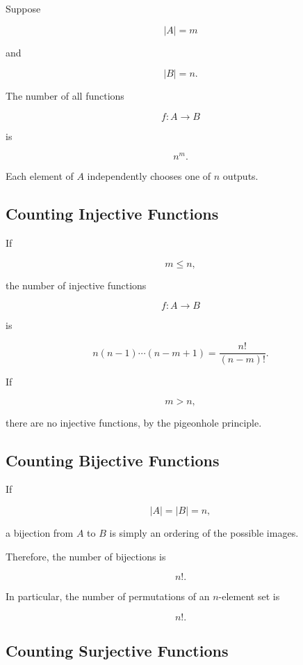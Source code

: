 Suppose

\[
|A|=m
\]

and

\[
|B|=n.
\]

The number of all functions

\[
f:A\to B
\]

is

\[
\boxed{
n^m.
}
\]

Each element of \(A\) independently chooses one of \(n\) outputs.

\subsection{Counting Injective Functions}
\label{subsec:counting-injective-functions}

If

\[
m\leq n,
\]

the number of injective functions

\[
f:A\to B
\]

is

\[
\boxed{
n(n-1)\cdots(n-m+1)
=
\frac{n!}{(n-m)!}.
}
\]

If

\[
m>n,
\]

there are no injective functions, by the pigeonhole principle.

\subsection{Counting Bijective Functions}
\label{subsec:counting-bijective-functions}

If

\[
|A|=|B|=n,
\]

a bijection from \(A\) to \(B\) is simply an ordering of the possible
images.

Therefore, the number of bijections is

\[
\boxed{
n!.
}
\]

In particular, the number of permutations of an \(n\)-element set is

\[
n!.
\]

\subsection{Counting Surjective Functions}
\label{subsec:counting-surjective-functions}

